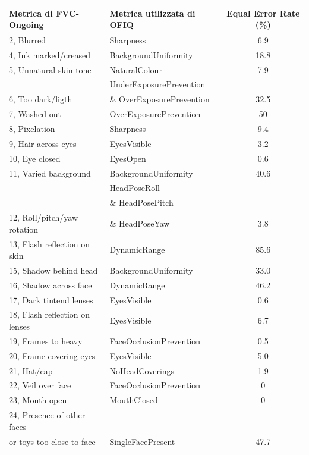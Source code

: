 \documentclass[12pt,a4paper,openright,twoside]{book}
\begin{document}
\begin{tabular}{llc}
\toprule
Metrica di FVC-Ongoing & Metrica utilizzata di OFIQ & Equal Error Rate (\%) \\
\midrule
2, Blurred & Sharpness & 6.9 \\
4, Ink marked/creased & BackgroundUniformity & 18.8 \\
5, Unnatural skin tone & NaturalColour & 7.9 \\
 & UnderExposurePrevention \\ 6, Too dark/ligth & \& OverExposurePrevention & 32.5 \\
7, Washed out & OverExposurePrevention & 50 \\
8, Pixelation & Sharpness & 9.4 \\
9, Hair across eyes & EyesVisible & 3.2 \\
10, Eye closed & EyesOpen & 0.6 \\
11, Varied background & BackgroundUniformity & 40.6 \\
 & HeadPoseRoll \\ & \& HeadPosePitch \\ 12, Roll/pitch/yaw rotation & \& HeadPoseYaw & 3.8 \\
13, Flash reflection on skin & DynamicRange & 85.6 \\
15, Shadow behind head & BackgroundUniformity & 33.0 \\
16, Shadow across face & DynamicRange & 46.2 \\
17, Dark tintend lenses & EyesVisible & 0.6 \\
18, Flash reflection on lenses & EyesVisible & 6.7 \\
19, Frames to heavy & FaceOcclusionPrevention & 0.5 \\
20, Frame covering eyes & EyesVisible & 5.0 \\
21, Hat/cap & NoHeadCoverings & 1.9 \\
22, Veil over face & FaceOcclusionPrevention & 0 \\
23, Mouth open & MouthClosed & 0 \\
24, Presence of other faces \\ or toys too close to face & SingleFacePresent & 47.7 \\
\bottomrule
\end{tabular}
\end{document}
